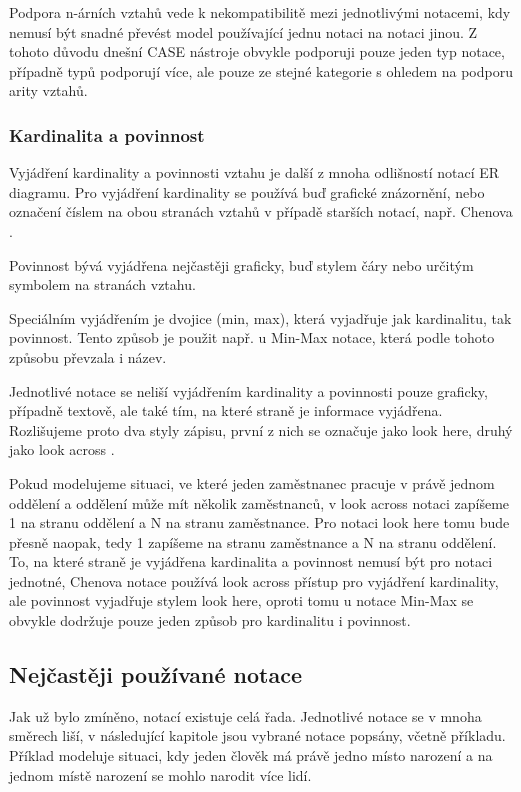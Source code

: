 \documentclass[czech,bachelor,public,dept460,male,oneside]{diploma}
\begin{document}
	Podpora n-árních vztahů vede k nekompatibilitě mezi jednotlivými notacemi, kdy nemusí být snadné převést model používající jednu notaci na notaci jinou. Z tohoto důvodu dnešní CASE nástroje obvykle podporuji pouze jeden typ notace, případně typů podporují více, ale pouze ze stejné kategorie s ohledem na podporu arity vztahů. 
	
	\subsubsection{Kardinalita a povinnost}
	Vyjádření kardinality a povinnosti vztahu je další z mnoha odlišností notací ER diagramu. Pro vyjádření kardinality se používá buď grafické znázornění, nebo označení číslem na obou stranách vztahů v případě starších notací, např. Chenova \cite{dbVsb}. 
	
	Povinnost bývá vyjádřena nejčastěji graficky, buď stylem čáry nebo určitým symbolem na stranách vztahu. 
	
	Speciálním vyjádřením je dvojice (min, max), která vyjadřuje jak kardinalitu, tak povinnost. Tento způsob je použit např. u Min-Max notace, která podle tohoto způsobu převzala i název. 
	
	Jednotlivé notace se neliší vyjádřením kardinality a povinnosti pouze graficky, případně textově, ale také tím, na které straně je informace vyjádřena. Rozlišujeme proto dva styly zápisu, první z nich se označuje jako look here, druhý jako look across \cite{compErNotations}. 
	
	Pokud modelujeme situaci, ve které jeden zaměstnanec pracuje v právě jednom oddělení a oddělení může mít několik zaměstnanců, v look across notaci zapíšeme 1 na stranu oddělení a N na stranu zaměstnance. Pro notaci look here tomu bude přesně naopak, tedy 1 zapíšeme na stranu zaměstnance a N na stranu oddělení. To, na které straně je vyjádřena kardinalita a povinnost nemusí být pro notaci jednotné, Chenova notace používá look across přístup pro vyjádření kardinality, ale povinnost vyjadřuje stylem look here, oproti tomu u notace Min-Max se obvykle dodržuje pouze jeden způsob pro kardinalitu i povinnost.
	
	\subsection{Nejčastěji používané notace}
	Jak už bylo zmíněno, notací existuje celá řada. Jednotlivé notace se v mnoha směrech liší, v následující kapitole jsou vybrané notace popsány, včetně příkladu. Příklad modeluje situaci, kdy jeden člověk má právě jedno místo narození a na jednom místě narození se mohlo narodit více lidí.
	
\end{document}
